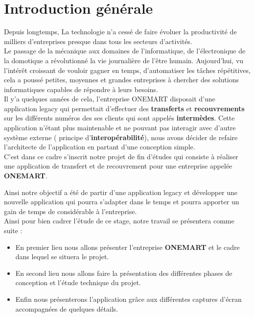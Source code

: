 \chapter*{Introduction générale}

Depuis longtemps, La technologie n'a cessé de faire évoluer la productivité de milliers d'entreprises presque dans tous les secteurs d'activités.\\
Le passage de la mécanique aux domaines de l'informatique, de l'électronique de la domotique a révolutionné la vie journalière de l'être humain.
Aujourd'hui, vu l'intérêt croissant de vouloir gagner en temps, d'automatiser les tâches répétitives, cela a poussé petites, moyennes et grandes entreprises à chercher des solutions informatiques capables de répondre à leurs besoins.\\


Il y'a quelques années de cela, l'entreprise ONEMART disposait d'une application legacy qui permettait d'effectuer des \textbf{transferts} et \textbf{recouvrements} sur les différents numéros des ses clients qui sont appelés \textbf{intermèdes}. Cette application n'étant plus maintenable et ne pouvant pas interagir avec d'autre système externe ( principe d'\textbf{interopérabilité}), nous avons décider de refaire l'architecte de l'application en partant d'une conception simple.\\

C'est dans ce cadre s'inscrit notre projet de fin d'études qui consiste à réaliser une application de transfert et de recouvrement pour une entreprise appelée \textbf{ONEMART}.

Ainsi notre objectif a été de partir d'une application legacy et développer une nouvelle application qui pourra s'adapter dans le temps et pourra apporter un gain de temps de considérable à l'entreprise.\\

Ainsi pour bien cadrer l'étude de ce stage, notre travail se présentera comme suite :\\
\begin{itemize}
	\item En premier lieu nous allons présenter l'entreprise \textbf{ONEMART} et le cadre dans lequel se situera le projet.
	\item En second lieu nous allons faire la présentation des différentes phases de conception et l'étude technique du projet.
	\item Enfin nous présenterons l'application grâce aux différentes captures d'écran accompagnées de quelques détails.
\end{itemize}